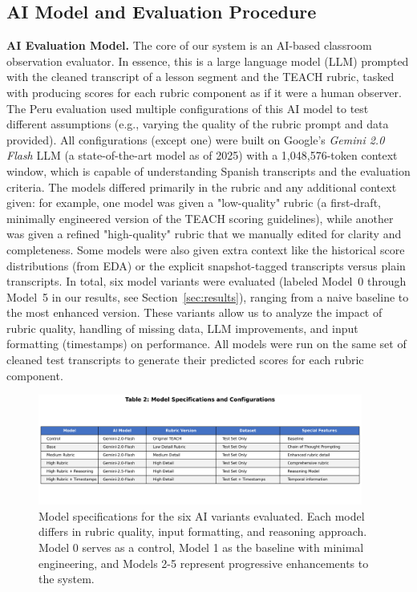 \documentclass[12pt]{article}
\begin{document}
\subsection{AI Model and Evaluation Procedure}
\noindent \textbf{AI Evaluation Model.} The core of our system is an AI-based classroom observation evaluator. In essence, this is a large language model (LLM) prompted with the cleaned transcript of a lesson segment and the TEACH rubric, tasked with producing scores for each rubric component as if it were a human observer. The Peru evaluation used multiple configurations of this AI model to test different assumptions (e.g., varying the quality of the rubric prompt and data provided). All configurations (except one) were built on Google's \textit{Gemini 2.0 Flash} LLM (a state-of-the-art model as of 2025) with a 1,048,576-token context window, which is capable of understanding Spanish transcripts and the evaluation criteria. The models differed primarily in the rubric and any additional context given: for example, one model was given a "low-quality" rubric (a first-draft, minimally engineered version of the TEACH scoring guidelines), while another was given a refined "high-quality" rubric that we manually edited for clarity and completeness. Some models were also given extra context like the historical score distributions (from EDA) or the explicit snapshot-tagged transcripts versus plain transcripts. In total, six model variants were evaluated (labeled Model~0 through Model~5 in our results, see Section~\ref{sec:results}), ranging from a naive baseline to the most enhanced version. These variants allow us to analyze the impact of rubric quality, handling of missing data, LLM improvements, and input formatting (timestamps) on performance. All models were run on the same set of cleaned test transcripts to generate their predicted scores for each rubric component.

\begin{figure}[t]\centering
\includegraphics[width=0.95\textwidth]{model_specifications_table.png}
\caption{Model specifications for the six AI variants evaluated. Each model differs in rubric quality, input formatting, and reasoning approach. Model 0 serves as a control, Model 1 as the baseline with minimal engineering, and Models 2-5 represent progressive enhancements to the system.}
\label{fig:model-specs}
\end{figure}
\end{document}
